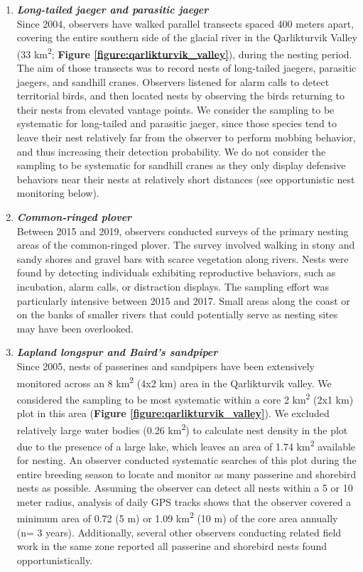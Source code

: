 \documentclass[a4paper,twoside,10pt]{article}
\begin{document}
\begin{enumerate}[label=\roman*]
	\item[] \textit{\textbf{Long-tailed jaeger and parasitic jaeger}} \\
	Since 2004, observers have walked parallel transects spaced 400 meters apart, covering the entire southern side of the glacial river in the Qarlikturvik Valley (33 km\textsuperscript{2}; \textbf{Figure \ref{figure:qarlikturvik_valley}}), during the nesting period. The aim of those transects was to record nests of long-tailed jaegers, parasitic jaegers, and sandhill cranes. Observers listened for alarm calls to detect territorial birds, and then located nests by observing the birds returning to their nests from elevated vantage points. We consider the sampling to be systematic for long-tailed and parasitic jaeger, since those species tend to leave their nest relatively far from the observer to perform mobbing behavior, and thus increasing their detection probability. We do not consider the sampling to be systematic for sandhill cranes as they only display defensive behaviors near their nests at relatively short distances (see opportunistic nest monitoring below).\\
	
	\item[] \textit{\textbf{Common-ringed plover}} \\
	Between 2015 and 2019, observers conducted surveys of the primary nesting areas of the common-ringed plover. The survey involved walking in stony and sandy shores and gravel bars with scarce vegetation along rivers. Nests were found by detecting individuals exhibiting reproductive behaviors, such as incubation, alarm calls, or distraction displays. The sampling effort was particularly intensive between 2015 and 2017. Small areas along the coast or on the banks of smaller rivers that could potentially serve as nesting sites may have been overlooked.\\
	
	\item[] \textit{\textbf{Lapland longspur and Baird's sandpiper}}\\
	Since 2005, nests of passerines and sandpipers have been extensively monitored across an 8 km\textsuperscript{2} (4x2 km) area in the Qarlikturvik valley. We considered the sampling to be most systematic within a core 2 km\textsuperscript{2} (2x1 km) plot in this area (\textbf{Figure \ref{figure:qarlikturvik_valley}}). We excluded relatively large water bodies (0.26 km\textsuperscript{2}) to calculate nest density in the plot due to the presence of a large lake, which leaves an area of 1.74 km\textsuperscript{2} available for nesting. An observer conducted systematic searches of this plot during the entire breeding season to locate and monitor as many passerine and shorebird nests as possible. Assuming the observer can detect all nests within a 5 or 10 meter radius, analysis of daily GPS tracks shows that the observer covered a minimum area of 0.72  (5 m) or 1.09  km\textsuperscript{2} (10 m) of the core area annually (n= 3 years). Additionally, several other observers conducting related field work in the same zone reported all passerine and shorebird nests found opportunistically.\\
	

\end{enumerate}
\end{document}
